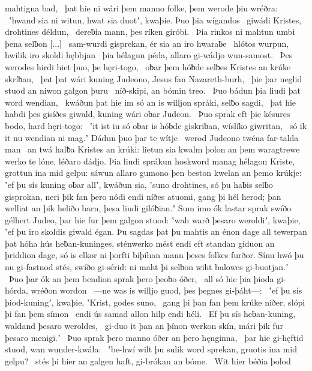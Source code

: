 mahtigna bad, \hld\ þat hie ni wári þem manno folke,
þem werode þiu wréðra: \hld\ ʽhwand sia ni witun, hwat sia duotʼ, kwaþie.
Þuo þia wígandos \hld\ giwádi Kristes,
drohtines déldun, \hld\ dereƀia mann,
þes ríken giróbi. \hld\ Þia rinkos ni mahtun
umbi þena selƀon {[...]} \hld\ sam-wurdi gisprekan,
ér sia an iro hwaraƀe \hld\ hlótos wurpun,
hwilik iro skoldi hębbjan \hld\ þia hélagun péda,
allaro gi-wádjo wun-samost. \hld\ Þes werodes hirdi
hiet þuo, þe hęri-togo, \hld\ oƀar þem hóƀde selƀes
Kristes an krúke skríƀan, \hld\ þat þat wári kuning Judeono,
Jesus fan Nazareth-burh, \hld\ þie þar neglid stuod
an niwon galgon þuru \hld\ níð-skipi,
an bómin treo. \hld\ Þuo bádun þia liudi
þat word wendian, \hld\ kwáðun þat hie im só an is willjon spráki,
selƀo sagdi, \hld\ þat hie habdi þes gisíðes giwald,
kuning wári oƀar Judeon. \hld\ Þuo sprak eft þie késures bodo,
hard hęri-togo: \hld\ ʽit ist iu só oƀar is hóƀde giskriƀan,
wíslíko giwritan, \hld\ só ik it nu wendian ni mag.ʼ
Dádun þuo þar te wítje \hld\ werod Judeono
twéna far-talda man \hld\ an twá halƀa
Kristes an krúki: lietun sia kwalm þolon
an þem waragtrewe werko te lóne,
léðaro dádjo. Þia liudi sprákun
hoskword manag hélagon Kriste,
grottun ina mid gelpu: sáwun allaro gumono þen beston
kwelan an þemo krúkje: ʽef þu sís kuning oƀar allʼ, kwáðun sia,
ʽsuno drohtines, só þu haƀis selƀo gisprokan,
neri þik fan þero nódi endi níðes atuomi,
gang þi hél herod; þan welliat an þik heliðo barn,
þesa liudi gilóƀian.ʼ Sum imo ók lastar sprak
swíðo gélhert Judeo, þar hie fur þem galgon stuod:
ʽwah warð þesaro weroldiʼ, kwaþie, ʽef þu iro skoldis giwald égan.
Þu sagdas þat þu mahtis an énon dage all tewerpan
þat hóha hús heƀan-kuninges,
sténwerko mést endi eft standan giduon
an þriddion dage, só is elkor ni þorfti biþíhan mann
þeses folkes furðor. Sínu hwó þu nu gi-fastnod stés,
swíðo gi-sérid: ni maht þi selƀon wiht
balowes gi-buotjan.ʼ \hld\ Þuo þar ók an þem bendion sprak
þero þeoƀo óðer, \hld\ all só hie þia þioda gi-hórda,
wréðon wordon \hld\ —ne was is willjo guod,
þes þegnes gi-þáht—: \hld\ ʽef þu sís þiod-kuningʼ, kwaþie,
ʽKrist, godes suno, \hld\ gang þi þan fan þem krúke niðer,
slópi þi fan þem símon \hld\ endi ús samad allon
hilp endi héli. \hld\ Ef þu sís heƀan-kuning,
waldand þesaro weroldes, \hld\ gi-duo it þan an þínon werkon skín,
mári þik fur þesaro menigi.ʼ \hld\ Þuo sprak þero manno óðer
an þero hęnginna, \hld\ þar hie gi-hęftid stuod,
wan wunder-kwála: \hld\ ʽbe-hwí wilt þu sulik word sprekan,
gruotis ina mid gelpu? \hld\ stés þi hier an galgen haft,
gi-brókan an bóme. \hld\ Wit hier béðia þolod
